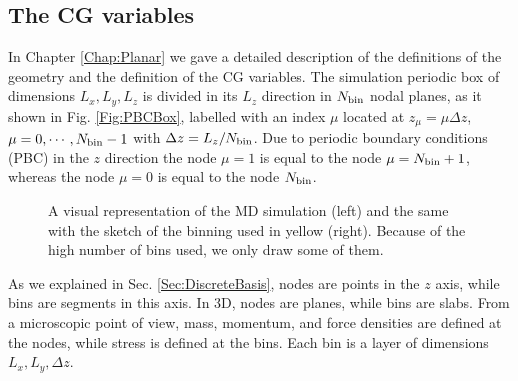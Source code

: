 \documentclass[b5paper,openright,10pt]{book}
\newcommand{\Note}[1]{{\bf \color{red}#1}}    %
\begin{document}
\subsection{The CG variables}
\label{Sec:CGVariablesPBC}
In Chapter \ref{Chap:Planar} we gave a detailed description of the definitions of the geometry and the definition of the CG variables.
The simulation periodic box of  dimensions $L_x,L_y,L_z$ is divided in
its $L_z$  direction in  $N_{\rm bin}$ nodal  planes, as it shown in Fig. \ref{Fig:PBCBox}, labelled
with   an    index   $\mu$   located   at    $z_\mu=\mu   \Delta   z$,
$\mu=0,\cdots,N_{\rm bin}-1$ with $\Delta  z=L_z/N_{\rm bin}$.  Due to
periodic  boundary conditions  (PBC)  in the  $z$  direction the  node
$\mu=1$ is equal to the node  $\mu=N_{\rm bin}+1$, whereas the node $\mu=0$
is equal to the node  $N_{\rm bin}$.  

\begin{figure}
    \centering
    \caption[Visual representation of the MD simulation of an unconfined fluid]{A visual representation of the MD simulation (left) and the same with the sketch of the binning used in yellow (right). Because of the high number of bins used, we only draw some of them.}
    \label{fig:PBCBox}
\end{figure}

As we explained in Sec. \ref{Sec:DiscreteBasis}, nodes are  points  in  the $z$  axis,  while bins  are
segments in this axis.  In 3D, nodes are planes, while bins are slabs.
From  a microscopic point of  view, mass,
momentum, and force  densities are defined at the  nodes, while stress
is  defined  at  the  bins.   Each   bin  is  a  layer  of  dimensions
$L_x,L_y,\Delta z$. 
\end{document}
